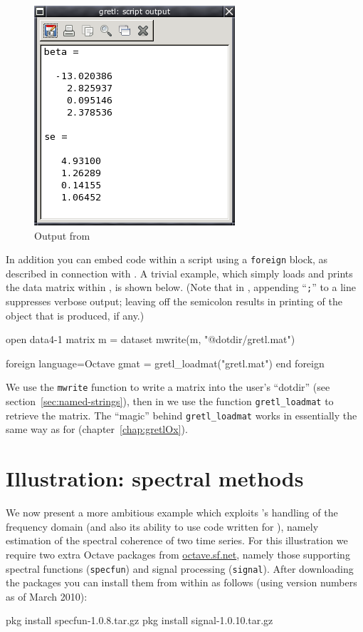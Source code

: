 \begin{figure}[htbp]
  \centering
  \includegraphics[scale=0.7]{figures/Octout}
  \caption{Output from }
  \label{fig:Octout}
\end{figure}

In addition you can embed  code within a 
script using a \texttt{foreign} block, as described in connection with
.  A trivial example, which simply loads and prints the
 data matrix within , is shown below. (Note
that in , appending ``\texttt{;}'' to a line suppresses
verbose output; leaving off the semicolon results in printing of the
object that is produced, if any.)
%
\begin{code}
open data4-1
matrix m = { dataset }
mwrite(m, "@dotdir/gretl.mat")

foreign language=Octave
   gmat = gretl_loadmat("gretl.mat")
end foreign
\end{code}

We use the \texttt{mwrite} function to write a matrix into the user's
``dotdir'' (see section~\ref{sec:named-strings}), then in 
we use the function \verb|gretl_loadmat| to retrieve the matrix. The
``magic'' behind \verb|gretl_loadmat| works in essentially the same
way as for  (chapter~\ref{chap:gretlOx}).

\section{Illustration: spectral methods}
\label{sec:octave-coher}

We now present a more ambitious example which exploits 's
handling of the frequency domain (and also its ability to use code
written for ), namely estimation of the spectral coherence
of two time series.  For this illustration we require two extra Octave
packages from \url{octave.sf.net}, namely those supporting spectral
functions (\texttt{specfun}) and signal processing (\texttt{signal}).
After downloading the packages you can install them from within
 as follows (using version numbers as of March 2010):
\begin{code}
pkg install specfun-1.0.8.tar.gz 
pkg install signal-1.0.10.tar.gz 
\end{code}


